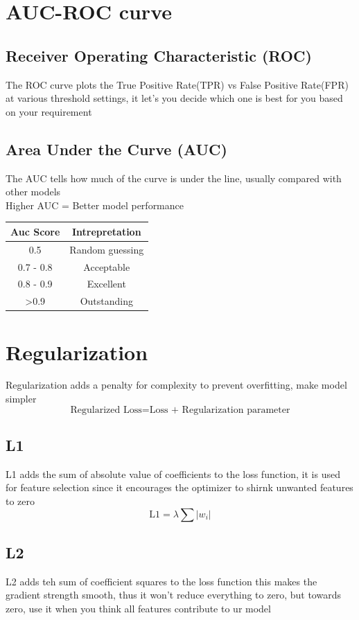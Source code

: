 \documentclass[12pt]{extarticle}
\begin{document}
\section{AUC-ROC curve}
\subsection{Receiver Operating Characteristic (ROC)}
The ROC curve plots the True Positive Rate(TPR) vs False Positive Rate(FPR) at various threshold settings,
it let's you decide which one is best for you based on your requirement
\subsection{Area Under the Curve (AUC)}
The AUC tells how much of the curve is under the line,
usually compared with other models\\
Higher AUC = Better model performance \\

\begin{table}[H]
    \centering
    \begin{tabular}{|c|c|}
        \hline
        Auc Score & Intrepretation \\
        \hline
         0.5 &  Random guessing \\
         0.7 - 0.8 & Acceptable \\
         0.8 - 0.9 & Excellent \\
         \textgreater 0.9 & Outstanding\\
         \hline     
    \end{tabular}
\end{table}

\section{Regularization}
Regularization adds a penalty for complexity to prevent overfitting, make model simpler
$$\text{Regularized Loss} = \text{Loss + Regularization parameter}$$

\subsection{L1}
L1 adds the sum of absolute value of coefficients to the loss function, 
it is used for feature selection since it encourages the optimizer to shirnk
unwanted features to zero
$$\text{L1} = \lambda \sum|w_i| $$

\subsection{L2}
L2 adds teh sum of coefficient squares to the loss function this 
makes the gradient strength smooth, thus it won't reduce everything 
to zero, but towards zero, use it when you think all features contribute
to ur model
\end{document}
